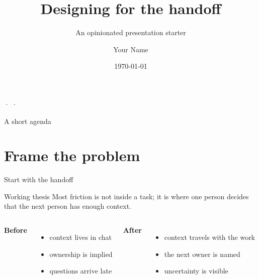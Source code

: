 \documentclass[aspectratio=169,10pt]{beamer}
\title[Designing for the handoff]{Designing for the handoff}
\subtitle{An opinionated presentation starter}
\author[Your Name]{Your Name}
\institute{Your Team}
\date{\today}
\begin{document}
\begin{frame}[plain]
  \vfill\hspace{.6cm}\begin{minipage}{.68\paperwidth}\color{white}\inserttitle\par\vspace{.2cm}\Large\insertsubtitle\par\vspace{.6cm}\normalsize\insertauthor\quad · \quad\insertinstitute\quad · \quad\insertdate\end{minipage}\vfill
\end{frame}
\begin{frame}{A short agenda}
  \tableofcontents
\end{frame}
\section{Frame the problem}
\begin{frame}{Start with the handoff}
  \begin{block}{Working thesis}
    Most friction is not inside a task; it is where one person decides that the next person has enough context.
  \end{block}
  \vspace{.4cm}
  \begin{columns}[T,onlytextwidth]
    \textbf{Before}\begin{itemize}\item context lives in chat\item ownership is implied\item questions arrive late\end{itemize}
    \textbf{After}\begin{itemize}\item context travels with the work\item the next owner is named\item uncertainty is visible\end{itemize}
  \end{columns}
\end{frame}
\end{document}
